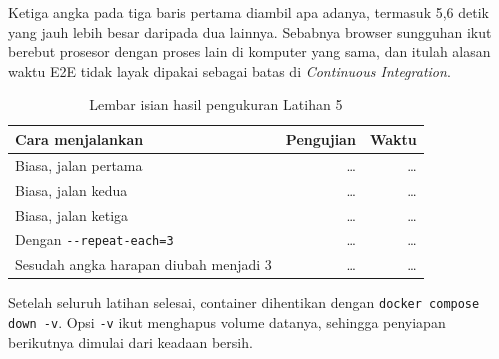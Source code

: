 Ketiga angka pada tiga baris pertama diambil apa adanya, termasuk 5,6 detik
yang jauh lebih besar daripada dua lainnya. Sebabnya browser sungguhan ikut
berebut prosesor dengan proses lain di komputer yang sama, dan itulah alasan
waktu E2E tidak layak dipakai sebagai batas di \textit{Continuous
Integration}.

\begin{table}[!htb]
  \centering
  \caption{Lembar isian hasil pengukuran Latihan 5}
  \label{tab:c6-lat5-hasil}
  \begin{tabularx}{\textwidth}{Xrr}
    \hline
    \textbf{Cara menjalankan} & \textbf{Pengujian} & \textbf{Waktu} \\
    \hline
    Biasa, jalan pertama & \dots & \dots \\
    \hline
    Biasa, jalan kedua & \dots & \dots \\
    \hline
    Biasa, jalan ketiga & \dots & \dots \\
    \hline
    Dengan \texttt{-{}-repeat-each=3} & \dots & \dots \\
    \hline
    Sesudah angka harapan diubah menjadi 3 & \dots & \dots \\
    \hline
  \end{tabularx}
\end{table}

Setelah seluruh latihan selesai, container dihentikan dengan
\texttt{docker compose down -v}. Opsi \texttt{-v} ikut menghapus volume
datanya, sehingga penyiapan berikutnya dimulai dari keadaan bersih.
